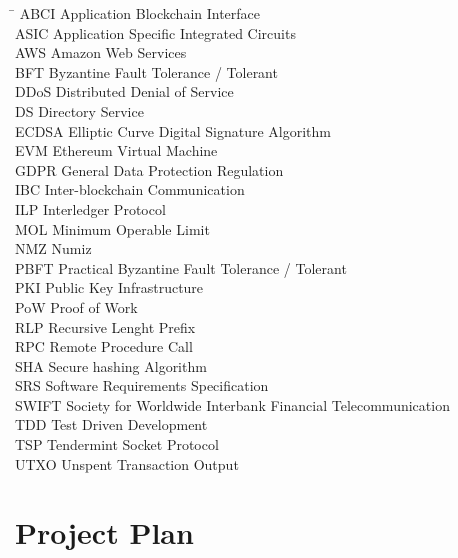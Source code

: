 \documentclass[a4paper,twoside,phd]{BYUPhys}
\begin{document}
\begin{tabbing}
\hspace*{4cm}\= \kill
ABCI \> Application Blockchain Interface\\
ASIC \> Application Specific Integrated Circuits\\
AWS \> Amazon Web Services\\
BFT \> Byzantine Fault Tolerance / Tolerant\\
DDoS \> Distributed Denial of Service\\
DS \> Directory Service\\
ECDSA \> Elliptic Curve Digital Signature Algorithm\\
EVM \> Ethereum Virtual Machine\\
GDPR \> General Data Protection Regulation\\
IBC \> Inter-blockchain Communication\\
ILP \> Interledger Protocol\\
MOL \> Minimum Operable Limit\\
NMZ \> Numiz\\
PBFT \> Practical Byzantine Fault Tolerance / Tolerant\\
PKI \> Public Key Infrastructure\\
PoW \> Proof of Work\\
RLP \> Recursive Lenght Prefix\\
RPC \> Remote Procedure Call\\
SHA \> Secure hashing Algorithm\\
SRS \> Software Requirements Specification\\
SWIFT \> Society for Worldwide Interbank Financial Telecommunication\\
TDD \> Test Driven Development\\
TSP \> Tendermint Socket Protocol\\
UTXO \> Unspent Transaction Output\\
\end{tabbing}


\appendix
\chapter{Project Plan}
\label{projectplan}
\end{document}
